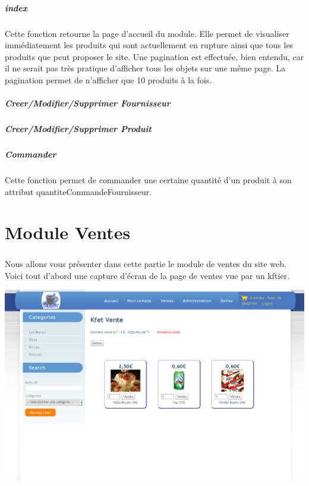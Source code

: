 \documentclass[twoside,UTF8]{EPURapport}
\begin{document}
\paragraph{index} Cette fonction retourne la page d'accueil du module. Elle permet de visualiser immédiatement les produits qui sont actuellement en rupture ainsi que tous les produits que peut proposer le site. Une pagination est effectuée, bien entendu, car il ne serait pas très pratique d'afficher tous les objets sur une même page. La pagination permet de n'afficher que 10 produits à la fois.

\paragraph{Creer/Modifier/Supprimer Fournisseur}

\paragraph{Creer/Modifier/Supprimer Produit}

\paragraph{Commander} Cette fonction permet de commander une certaine quantité d'un produit à son attribut quantiteCommandeFournisseur. 

\chapter{Module Ventes}%

    \paragraph{}Nous allons vous présenter dans cette partie le module de ventes du site web. Voici tout d'abord une capture d'écran de la page de ventes vue par un kftier.
    \begin{center}
        \includegraphics[width=1\linewidth]{logos/ventes.png}
    \end{center}
\end{document}
